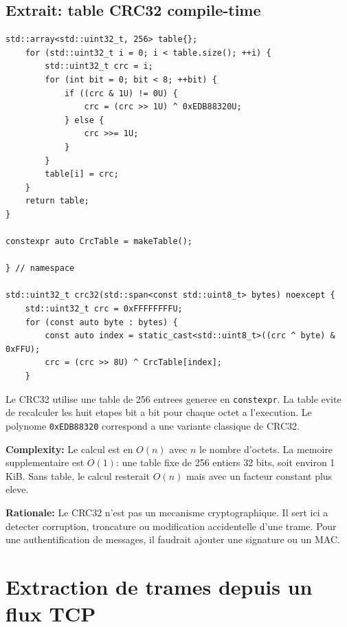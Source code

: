 \documentclass[10pt,a4paper]{article}
\newcommand{\complexity}[1]{\textbf{Complexity:} #1}
\newcommand{\rationale}[1]{\textbf{Rationale:} #1}
\begin{document}
\subsection{Extrait: table CRC32 compile-time}
\begin{lstlisting}[caption={CRC32 table-driven}]
    std::array<std::uint32_t, 256> table{};
    for (std::uint32_t i = 0; i < table.size(); ++i) {
        std::uint32_t crc = i;
        for (int bit = 0; bit < 8; ++bit) {
            if ((crc & 1U) != 0U) {
                crc = (crc >> 1U) ^ 0xEDB88320U;
            } else {
                crc >>= 1U;
            }
        }
        table[i] = crc;
    }
    return table;
}

constexpr auto CrcTable = makeTable();

} // namespace

std::uint32_t crc32(std::span<const std::uint8_t> bytes) noexcept {
    std::uint32_t crc = 0xFFFFFFFFU;
    for (const auto byte : bytes) {
        const auto index = static_cast<std::uint8_t>((crc ^ byte) & 0xFFU);
        crc = (crc >> 8U) ^ CrcTable[index];
    }
\end{lstlisting}


Le CRC32 utilise une table de 256 entrees generee en \texttt{constexpr}. La table evite de recalculer les huit etapes bit a bit pour chaque octet a l'execution. Le polynome \texttt{0xEDB88320} correspond a une variante classique de CRC32.

\complexity{Le calcul est en $O(n)$ avec $n$ le nombre d'octets. La memoire supplementaire est $O(1)$: une table fixe de 256 entiers 32 bits, soit environ 1 KiB. Sans table, le calcul resterait $O(n)$ mais avec un facteur constant plus eleve.}

\rationale{Le CRC32 n'est pas un mecanisme cryptographique. Il sert ici a detecter corruption, troncature ou modification accidentelle d'une trame. Pour une authentification de messages, il faudrait ajouter une signature ou un MAC.}

\section{Extraction de trames depuis un flux TCP}
\end{document}
